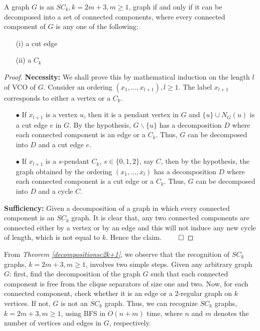 \documentclass[runningheads]{llncs}
\begin{document}
\begin{theorem}
\label{decompositionsc2k+1}
A graph $G$ is an $SC_{k}, k = 2m+3, m \geq 1$, graph if and only if it can be decomposed into a set of connected components, where every connected component of $G$ is any one of the following:
\begin{itemize}
\item[(i)] a cut edge
\item[(ii)] a $C_k$
\end{itemize}
\end{theorem}
\begin{proof}
\textbf{Necessity:}  We shall prove this by mathematical induction on the length $l$ of VCO of $G$.
\noindent Consider an ordering $(x_1,\ldots,x_{l+1}), l\geq 1$. The label $x_{l+1}$ corresponds to either a vertex or a $C_k$. 
\begin{itemize}
\item[$\bullet$] 
If $x_{l+1}$ is a vertex $u$, then it is a pendant vertex in $G$ and $\{u\} \cup N_G(u)$ is a cut edge $e$ in $G$. By the hypothesis, $G\backslash \{u\}$ has a decomposition $D$ where each connected component is an edge or a $C_k$. Thus, $G$ can be decomposed into $D$ and a cut edge $e$.

\item[$\bullet$] 
If $x_{l+1}$ is a $s$-pendant $C_k$, $s \in \{0,1,2\}$, say $C$, then by the hypothesis, the graph obtained by the ordering $(x_1,\ldots,x_l)$ has a decomposition $D$ where each connected component is a cut edge or a $C_k$. Thus, $G$ can be decomposed into $D$ and a cycle $C$.

\end{itemize}

\noindent \textbf{Sufficiency:} Given a decomposition of a graph in which every connected component is an $SC_k$ graph. It is clear that, any two connected components are connected either by a vertex or by an edge and this will not induce any new cycle of length, which is not equal to $k$. Hence the claim. $\hfill \qed$
\end{proof}



\noindent From \emph{Theorem \ref{decompositionsc2k+1}}, we observe that the recognition of $SC_k$ graphs, $k = 2m+3, m \geq 1$, involves two simple steps. Given any arbitrary graph $G$: first, find the decomposition of the graph $G$ such that each connected component is free from the clique separators of size one and two. Now, for each connected component, check whether it is an edge or a 2-regular graph on $k$ vertices. If not, $G$ is not an $SC_k$ graph. Thus, we can recognize $SC_k$ graphs, $k = 2m+3, m \geq 1$, using BFS in $O(n+m)$ time, where $n$ and $m$ denotes the number of vertices and edges in $G$, respectively.
\end{document}
